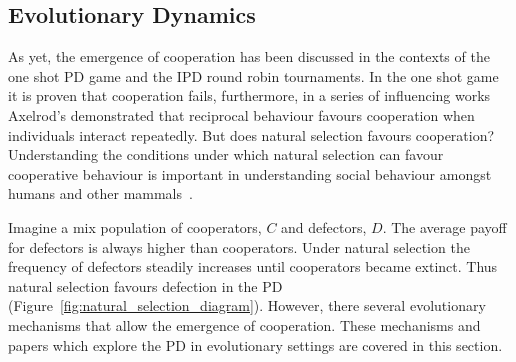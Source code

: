 \documentclass{article}
\theoremstyle{definition}
\begin{document}


\subsection{Evolutionary Dynamics}\label{subsection:evolutionary_dynamics}

As yet, the emergence of cooperation has been discussed in the contexts of the
one shot PD game and the IPD round robin tournaments. In the one shot game it is
proven that cooperation fails, furthermore, in a series of influencing works
Axelrod's demonstrated that reciprocal behaviour favours cooperation when
individuals interact repeatedly. But does natural selection favours cooperation?
Understanding the conditions under which natural selection can favour
cooperative behaviour is important in understanding social behaviour amongst
humans and other mammals~\cite{Boyd1987}.

Imagine a mix population of cooperators, \(C\) and defectors, \(D\). The average
payoff for defectors is always higher than cooperators. Under natural
selection the frequency of defectors steadily increases until cooperators
became extinct. Thus natural selection favours defection in the PD
(Figure~\ref{fig:natural_selection_diagram}). However, there several
evolutionary mechanisms that allow the emergence of cooperation. These
mechanisms and papers which explore the PD in evolutionary settings are
covered in this section.
\end{document}
